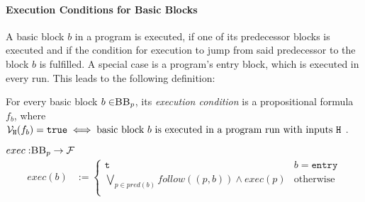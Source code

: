 \paragraph{Execution Conditions for Basic Blocks}
A basic block $b$ in a program is executed, if one of its predecessor blocks is executed and if the condition for execution to jump from said predecessor to the block $b$ is fulfilled. A special case is a program's entry block, which is executed in every run. This leads to the following definition: 

\begin{definition}
    For every basic block $b \in \mbb_p$, its \emph{execution condition} is a propositional formula $f_b$, where $\mathcal{V}_{\mathtt{H}}(f_b) = \mathtt{true} \iff \text{basic block $b$ is executed in a program run with inputs \texttt{H} }$. 
    \begin{center}
        $exec: \mbb_p \to \mbform$\\
        \begin{align*}
            exec(b) &:= \begin{cases}
                \mttt &  b = \mathtt{entry}\\
                \bigvee\limits_{p \in pred(b)} follow((p, b)) \land exec(p) & \text{otherwise}\\
        \end{cases}\\
        \end{align*}
    \end{center}
\end{definition}

